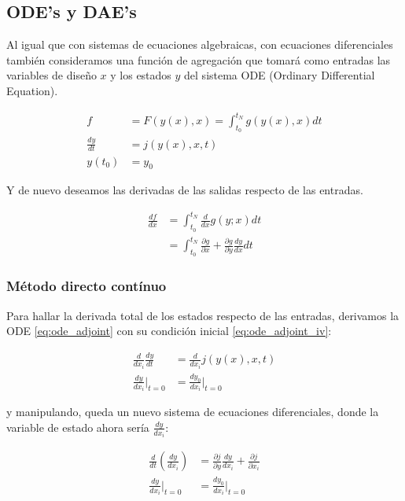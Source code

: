 \subsection{ODE's y DAE's}

Al igual que con sistemas de ecuaciones algebraicas, con ecuaciones
diferenciales también consideramos una función de agregación que tomará como
entradas las variables de diseño $x$ y los estados $y$ del sistema ODE
(Ordinary Differential Equation).

\begin{align}
	f             & = F(y(x), x) = \int_{t_0}^{t_N} g(y(x), x) dt \\
	\frac{dy}{dt} & = j(y(x), x, t)  \label{eq:ode_adjoint}       \\
	y(t_0)        & = y_0  \label{eq:ode_adjoint_iv}
\end{align}


Y de nuevo deseamos las derivadas de las salidas respecto de las entradas.


\begin{align}
	\frac{df}{dx} & = \int_{t_0}^{t_N} \frac{d}{dx} g(y;x) dt \nonumber                                                \\
	              & = \int_{t_0}^{t_N} \frac{\partial g}{\partial x} + \frac{\partial g}{\partial y} \frac{d y}{dx} dt
\end{align}


\subsubsection{Método directo contínuo}

Para hallar la derivada total de los estados respecto de las entradas,
derivamos la ODE \eqref{eq:ode_adjoint} con su condición inicial \eqref{eq:ode_adjoint_iv}:

\begin{align}
	\frac{d}{dx_i} \frac{dy}{dt} & = \frac{d}{dx_i} j(y(x), x, t)   \\
	\frac{dy}{dx_i} \big|_{t=0}  & =  \frac{dy_0}{dx_i} \big|_{t=0}
\end{align}

y manipulando, queda un nuevo sistema de ecuaciones diferenciales, donde la
variable de estado ahora sería $\frac{dy}{dx_i}$:

\begin{align}
	\frac{d}{dt} \left( \frac{dy}{dx_i} \right) & = \frac{\partial j}{\partial y} \frac{dy}{dx_i} + \frac{\partial j}{\partial x_i} \\
	\frac{dy}{dx_i} \big|_{t=0}                 & = \frac{dy_0}{dx_i} \big|_{t=0}
\end{align}


